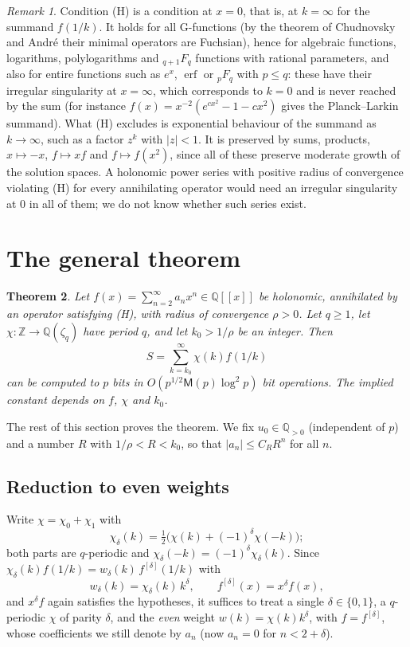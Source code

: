 \documentclass[11pt]{amsart}
\newtheorem{theorem}{Theorem}[section]
\theoremstyle{definition}
\theoremstyle{remark}
\newtheorem{remark}[theorem]{Remark}
\newcommand{\erf}{\operatorname{erf}}
\newcommand{\QQ}{\mathbb{Q}}
\newcommand{\ZZ}{\mathbb{Z}}
\newcommand{\Mul}{\mathsf{M}}
\begin{document}
\begin{remark}\label{rem:H}
Condition (H) is a condition at $x = 0$, that is, at $k = \infty$ for the summand $f(1/k)$. It holds for all
G-functions (by the theorem of Chudnovsky and Andr\'e their minimal operators are Fuchsian), hence for algebraic
functions, logarithms, polylogarithms and ${}_{q+1}F_q$ functions with rational parameters, and also for entire
functions such as $e^x$, $\erf$ or ${}_pF_q$ with $p \le q$: these have their irregular singularity at $x = \infty$,
which corresponds to $k = 0$ and is never reached by the sum (for instance $f(x) = x^{-2}(e^{cx^2} - 1 - cx^2)$
gives the Planck--Larkin summand). What (H) excludes is exponential behaviour of the summand as $k \to \infty$,
such as a factor $z^k$ with $|z| < 1$. It is preserved
by sums, products, $x \mapsto -x$, $f \mapsto x f$ and $f \mapsto f(x^2)$, since all of these preserve
moderate growth of the solution spaces. A holonomic power series with positive radius of convergence
violating (H) for every annihilating operator would need an irregular singularity at $0$ in all of
them; we do not know whether such series exist.
\end{remark}

\section{The general theorem}\label{sec:general}

\begin{theorem}\label{thm:main}
Let $f(x) = \sum_{n=2}^{\infty} a_n x^n \in \QQ[[x]]$ be holonomic, annihilated by an operator satisfying (H),
with radius of convergence $\rho > 0$. Let $q \ge 1$, let $\chi \colon \ZZ \to \QQ(\zeta_q)$ have period $q$, and
let $k_0 > 1/\rho$ be an integer. Then
\[
  S = \sum_{k=k_0}^{\infty} \chi(k) f(1/k)
\]
can be computed to $p$ bits in $O(p^{1/2}\Mul(p)\log^2 p)$ bit operations.
The implied constant depends on $f$, $\chi$ and $k_0$.
\end{theorem}

The rest of this section proves the theorem. We fix $u_0 \in \QQ_{>0}$ (independent of $p$) and a
number $R$ with $1/\rho < R < k_0$, so that $|a_n| \le C_R R^n$ for all $n$.

\subsection{Reduction to even weights}
Write $\chi = \chi_0 + \chi_1$ with
\[
  \chi_\delta(k) = \tfrac12\bigl(\chi(k) + (-1)^\delta\chi(-k)\bigr);
\]
both parts are $q$-periodic and $\chi_\delta(-k) = (-1)^\delta \chi_\delta(k)$. Since
$\chi_\delta(k) f(1/k) = w_\delta(k)\, f^{[\delta]}(1/k)$ with
\[
  w_\delta(k) = \chi_\delta(k)\, k^\delta, \qquad f^{[\delta]}(x) = x^\delta f(x),
\]
and $x^\delta f$ again satisfies the hypotheses, it suffices to treat a single $\delta \in \{0,1\}$, a
$q$-periodic $\chi$ of parity $\delta$, and the \emph{even} weight $w(k) = \chi(k)k^\delta$, with
$f = f^{[\delta]}$, whose coefficients we still denote by $a_n$ (now $a_n = 0$ for $n < 2 + \delta$).
\end{document}
